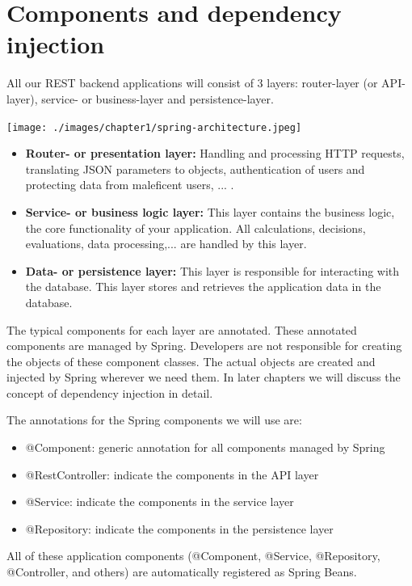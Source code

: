 \documentclass[a4paper, 12pt]{report}
\begin{document}
\section{Components and dependency injection}

All our REST backend applications will consist of 3 layers:
 router-layer (or API-layer), service- or business-layer and persistence-layer.

\texttt{[image: ./images/chapter1/spring-architecture.jpeg]} 

\begin{itemize}
\item \textbf{Router- or presentation layer:}  Handling and processing HTTP requests,  translating JSON parameters to objects,  authentication of users and protecting data from maleficent users,  ... .
\item \textbf{Service- or business logic layer:} This layer contains the business logic, the core functionality of your application. All calculations, decisions, evaluations, data processing,... are handled by this layer. 
\item \textbf{Data- or persistence layer:} This layer is responsible for interacting with the database.  This layer stores and retrieves the application data in the database.
\end{itemize}

The typical components for each layer are annotated.  These annotated components are managed by Spring. Developers are not responsible for creating the objects of these component classes. The actual objects are created and injected by Spring wherever we need them. In later chapters we will discuss the concept of dependency injection in detail.

The annotations for the Spring components we will use are:
\begin{itemize}
\item @Component: generic annotation for all components managed by Spring
\item @RestController: indicate the components in the API layer
\item @Service: indicate the components in the service layer
\item @Repository: indicate the components in the persistence layer
\end{itemize}

All of these application components (@Component, @Service, @Repository, @Controller, and others) are automatically registered as Spring Beans.
\end{document}
